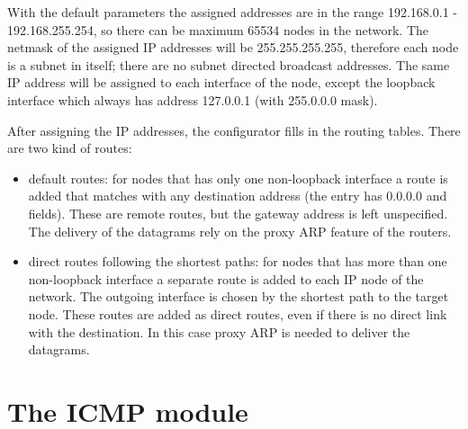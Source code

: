 With the default parameters the assigned addresses are in the range
192.168.0.1 - 192.168.255.254, so there can be maximum 65534 nodes in the
network. The netmask of the assigned IP addresses will be 255.255.255.255,
therefore each node is a subnet in itself; there are no subnet directed
broadcast addresses. The same IP address will be assigned to each interface
of the node, except the loopback interface which always has address 127.0.0.1
(with 255.0.0.0 mask).

After assigning the IP addresses, the configurator fills in the routing tables.
There are two kind of routes:
\begin{itemize}
  \item default routes: for nodes that has only one non-loopback interface
        a route is added that matches with any destination address
        (the entry has 0.0.0.0  and  fields).
        These are remote routes, but the gateway address is left unspecified.
        The delivery of the datagrams rely on the proxy ARP feature of the
        routers. 
  \item direct routes following the shortest paths: for nodes that has more
        than one non-loopback interface a separate route is added to each
        IP node of the network. The outgoing interface is chosen by the
        shortest path to the target node. These routes are
        added as direct routes, even if there is no direct link with the
        destination. In this case proxy ARP is needed to deliver the datagrams.
\end{itemize}



\section{The ICMP module}

